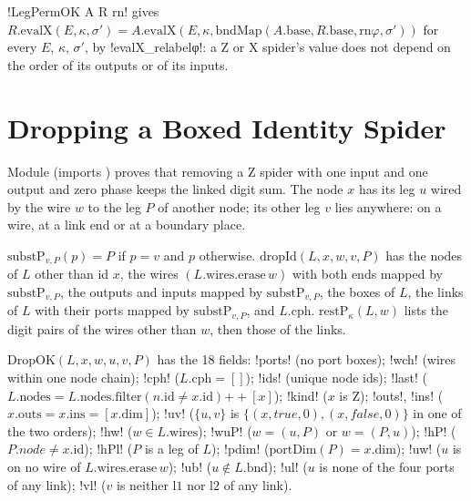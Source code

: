 \begin{theorem}\label{thm:lean-sym-legperm}
\lean!LegPermOK A R rn! gives $R.\mathrm{evalX}(E,\kappa,\sigma')=A.\mathrm{evalX}(E,\kappa,\mathrm{bndMap}(A.\mathrm{base},R.\mathrm{base},\mathrm{rn}\varphi,\sigma'))$ for every $E$, $\kappa$, $\sigma'$, by \lean!evalX_relabelφ!: a Z or X spider's value does not depend on the order of its outputs or of its inputs.
\end{theorem}

\section{Dropping a Boxed Identity Spider}\label{sec:lean-sym-drop}

Module  (imports ) proves that removing a Z spider with one input and one output and zero phase keeps the linked digit sum. The node $x$ has its leg $u$ wired by the wire $w$ to the leg $P$ of another node; its other leg $v$ lies anywhere: on a wire, at a link end or at a boundary place.

\begin{definition}
$\mathrm{substP}_{v,P}(p)=P$ if $p=v$ and $p$ otherwise. $\mathrm{dropId}(L,x,w,v,P)$ has the nodes of $L$ other than id $x$, the wires $(L.\mathrm{wires.erase}\,w)$ with both ends mapped by $\mathrm{substP}_{v,P}$, the outputs and inputs mapped by $\mathrm{substP}_{v,P}$, the boxes of $L$, the links of $L$ with their ports mapped by $\mathrm{substP}_{v,P}$, and $L.\mathrm{cph}$. $\mathrm{restP}_\kappa(L,w)$ lists the digit pairs of the wires other than $w$, then those of the links.
\end{definition}

\begin{definition}\label{def:lean-sym-dropok}
$\mathrm{DropOK}(L,x,w,u,v,P)$ has the 18 fields: \lean!ports! (no port boxes); \lean!wch! (wires within one node chain); \lean!cph! ($L.\mathrm{cph}=[]$); \lean!ids! (unique node ids); \lean!last! ($L.\mathrm{nodes}=L.\mathrm{nodes.filter}(n.\mathrm{id}\neq x.\mathrm{id})\mathbin{+\!\!+}[x]$); \lean!kind! ($x$ is Z); \lean!outs!, \lean!ins! ($x.\mathrm{outs}=x.\mathrm{ins}=[x.\mathrm{dim}]$); \lean!uv! ($\{u,v\}$ is $\{(x,\mathit{true},0),(x,\mathit{false},0)\}$ in one of the two orders); \lean!hw! ($w\in L.\mathrm{wires}$); \lean!wuP! ($w=(u,P)$ or $w=(P,u)$); \lean!hP! ($P.\mathit{node}\neq x.\mathrm{id}$); \lean!hPl! ($P$ is a leg of $L$); \lean!pdim! ($\mathrm{portDim}(P)=x.\mathrm{dim}$); \lean!uw! ($u$ is on no wire of $L.\mathrm{wires.erase}\,w$); \lean!ub! ($u\notin L.\mathrm{bnd}$); \lean!ul! ($u$ is none of the four ports of any link); \lean!vl! ($v$ is neither $\mathrm{l1}$ nor $\mathrm{l2}$ of any link).
\end{definition}

